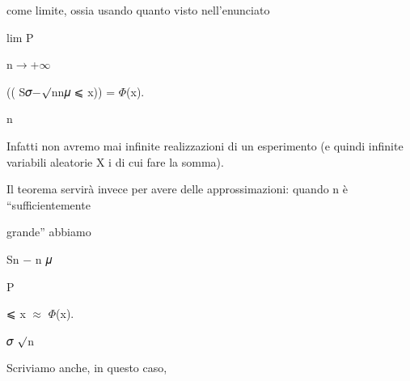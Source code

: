 \documentclass[a4paper,portrait,12pt]{article}
\begin{document}
\begin{flushleft}
come limite, ossia usando quanto visto nell'enunciato
\end{flushleft}


\begin{flushleft}
lim P
\end{flushleft}





\begin{flushleft}
n$\rightarrow$+$\infty$
\end{flushleft}





\begin{flushleft}
(( S𝜎$-$$\surd$nn𝜇 ⩽ x)) = $\Phi$(x).
\end{flushleft}


\begin{flushleft}
n
\end{flushleft}





\begin{flushleft}
Infatti non avremo mai infinite realizzazioni di un esperimento (e quindi infinite variabili aleatorie X i di cui fare la somma).
\end{flushleft}


\begin{flushleft}
Il teorema servir\`{a} invece per avere delle approssimazioni: quando n \`{e} {``}sufficientemente
\end{flushleft}


\begin{flushleft}
grande'' abbiamo
\end{flushleft}


\begin{flushleft}
Sn $-$ n 𝜇
\end{flushleft}


\begin{flushleft}
P
\end{flushleft}


\begin{flushleft}
⩽ x $\approx$ $\Phi$(x).
\end{flushleft}


\begin{flushleft}
𝜎 $\surd$n
\end{flushleft}


\begin{flushleft}
Scriviamo anche, in questo caso,
\end{flushleft}
\end{document}
